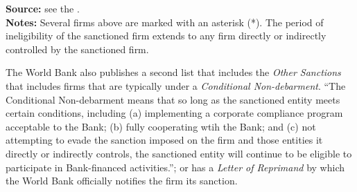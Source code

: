 \begin{table}[H]
\caption{Debarred Firms and Individuals (sample)}
\label{tab_debarred_sam}
\footnotesize{\textbf{Source:} see the \cite{wb_debarment}.\\ \textbf{Notes:} Several firms above are marked with an asterisk (*). The period of ineligibility of the sanctioned firm extends to any firm directly or indirectly controlled by the sanctioned firm.}
\end{table}


The World Bank also publishes a second list that includes the \textit{Other Sanctions} that includes firms that are typically under a \textit{Conditional Non-debarment}. ``The Conditional Non-debarment means that so long as the sanctioned entity meets certain conditions, including (a) implementing a corporate compliance program acceptable to the Bank; (b) fully cooperating wtih the Bank; and (c) not attempting to evade the sanction imposed on the firm and those entities it directly or indirectly controls, the sanctioned entity will continue to be eligible to participate in Bank-financed activities.''\parencite{wb_debarment}; or has a \textit{Letter of Reprimand} by which the World Bank officially notifies the firm its sanction.



